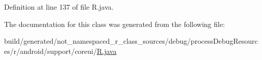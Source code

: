 Definition at line 137 of file R.\+java.



The documentation for this class was generated from the following file\+:\begin{DoxyCompactItemize}
\item 
build/generated/not\+\_\+namespaced\+\_\+r\+\_\+class\+\_\+sources/debug/process\+Debug\+Resources/r/android/support/coreui/\mbox{\hyperlink{android_2support_2coreui_2_r_8java}{R.\+java}}\end{DoxyCompactItemize}

